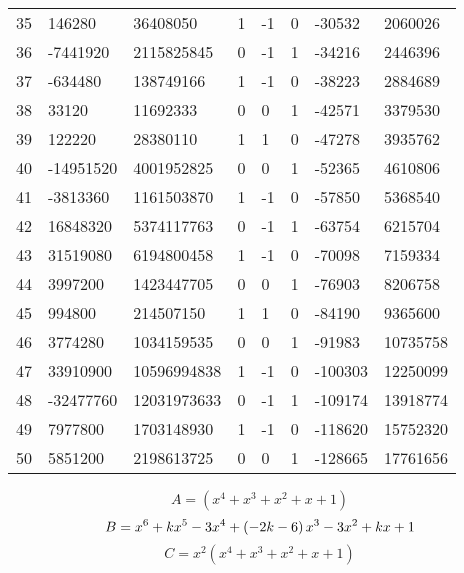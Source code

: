\documentclass{amsart}
\begin{document}
\begin{longtable}{|l|l|l|lllll|}
35&146280&36408050&1&-1&0&-30532&2060026\\
36&-7441920&2115825845&0&-1&1&-34216&2446396\\
37&-634480&138749166&1&-1&0&-38223&2884689\\
38&33120&11692333&0&0&1&-42571&3379530\\
39&122220&28380110&1&1&0&-47278&3935762\\
40&-14951520&4001952825&0&0&1&-52365&4610806\\
41&-3813360&1161503870&1&-1&0&-57850&5368540\\
42&16848320&5374117763&0&-1&1&-63754&6215704\\
43&31519080&6194800458&1&-1&0&-70098&7159334\\
44&3997200&1423447705&0&0&1&-76903&8206758\\
45&994800&214507150&1&1&0&-84190&9365600\\
46&3774280&1034159535&0&0&1&-91983&10735758\\
47&33910900&10596994838&1&-1&0&-100303&12250099\\
48&-32477760&12031973633&0&-1&1&-109174&13918774\\
49&7977800&1703148930&1&-1&0&-118620&15752320\\
50&5851200&2198613725&0&0&1&-128665&17761656\\
\hline
\end{longtable}
$$A=(x^4
 + x^3
 + x^2
 + x
 + 1)$$
$$B=x^6
 + k\*x^5
 - 3\*x^4
 + \left(-2\*k
 - 6\right) \*x^3
 - 3\*x^2
 + k\*x
 + 1$$
$$C=x^2(x^4
 + x^3
 + x^2
 + x
 + 1)$$
\end{document}

